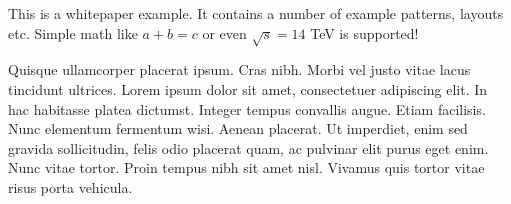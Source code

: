 
This is a whitepaper example. It contains a number of example
patterns, layouts etc.
Simple math like $a + b = c$ or even $\sqrt{s} = 14$ TeV is supported!

Quisque ullamcorper placerat ipsum. Cras nibh. Morbi vel justo vitae lacus
tincidunt ultrices. Lorem ipsum dolor sit amet, consectetuer adipiscing elit. In hac
habitasse platea dictumst. Integer tempus convallis augue. Etiam facilisis. Nunc
elementum fermentum wisi. Aenean placerat. Ut imperdiet, enim sed gravida
sollicitudin, felis odio placerat quam, ac pulvinar elit purus eget enim. Nunc vitae
tortor. Proin tempus nibh sit amet nisl. Vivamus quis tortor vitae risus porta
vehicula.